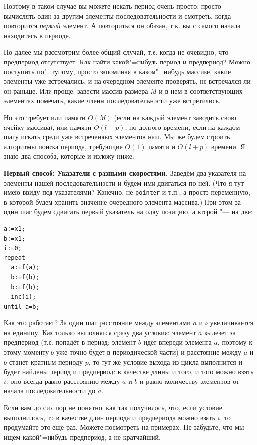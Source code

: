 Поэтому в таком случае вы можете искать период очень просто: просто вычислять один за другим 
элементы последовательности и смотреть, когда повторится \textit{первый} элемент. А повториться он 
обязан, т.к. вы с самого начала находитесь в периоде.

Но далее мы рассмотрим более общий случай, т.е. когда не очевидно, что предпериод отсутствует. 
Как найти какой"=нибудь период и предпериод? Можно поступить по"=тупому, просто запоминая в 
каком"=нибудь массиве, какие элементы уже встречались, и на очередном элементе проверять, не 
встречался ли он раньше. Или проще: завести массив размера $M$ и в нем в соответствующих 
элементах помечать, какие члены последовательности уже встретились.

Но это требует или памяти $O(M)$ (если на каждый элемент заводить свою ячейку массива), или 
памяти $O(l+p)$, но долгого времени, если на каждом шагу искать среди уже встреченных 
элементов наш. Мы же будем строить алгоритмы поиска периода, требующие $O(1)$ памяти и 
$O(l+p)$ времени. Я знаю два способа, которые и изложу ниже.

\textbf{Первый способ: Указатели с разными скоростями.} Заведём два указателя на элементы нашей 
последовательности и будем ими двигаться по ней. (Что я тут имею ввиду под указателями? 
Конечно, не \texttt{pointer} и т.п., а просто переменную, в которой будем хранить значение 
очередного элемента массива.) При этом за один шаг будем сдвигать первый указатель на одну 
позицию, а второй "--- на две:

\pagebreak[3]
\begin{codesampleo}\begin{verbatim}
a:=x1;
b:=x1;
i:=0;
repeat
  a:=f(a);
  b:=f(b);
  b:=f(b);
  inc(i);
until a=b;
\end{verbatim}
\end{codesampleo}

Как это работает? За один шаг расстояние между элементами $a$ и $b$ увеличивается на единицу. 
Как только выполнятся сразу два условия: элемент $a$ вылезет за предпериод (т.е. попадёт в 
период; элемент $b$ идёт впереди элемента $a$, поэтому к этому моменту $b$ уже точно будет в 
периодической части) и расстояние между $a$ и $b$ станет кратным периоду $p$, то тут же 
условие выхода из цикла выполнится и будет найдены период и предпериод: в качестве длины и того, 
и того можно взять $i$: оно всегда равно расстоянию между $a$ и $b$ и равно количеству 
элементов от начала последовательности до $a$.

Если вам до сих пор не понятно, как так получилось, что, если условие 
выполнилось, то в качестве длин периода и предпериода можно взять $i$, то продумайте это ещё 
раз. Можете посмотреть на примерах. Не забудьте, что мы ищем какой"=нибудь предпериод, а не 
кратчайший.

